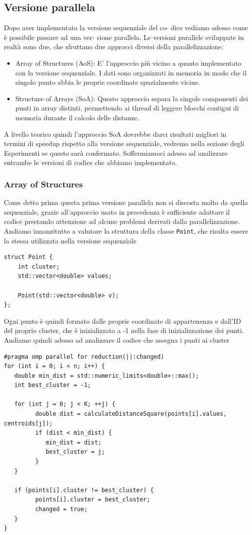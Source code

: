 \documentclass[10pt,twocolumn,letterpaper]{article}
\begin{document}
\subsection{Versione parallela}
Dopo aver implementato la versione sequenziale del co-
dice vediamo adesso come è possibile passare ad una ver-
sione parallela.
Le versioni parallele sviluppate in realtà sono due, che sfruttano due approcci diversi della parallelizzazione:
\begin{itemize}
   \item Array of Structures (AoS): E' l'approccio più vicino a quanto implementato con la versione sequenziale. I dati sono organizzati in memoria in modo che il singolo punto abbia le proprie coordinate spazialmente vicine.
   \item Structure of Arrays (SoA): Questo approccio separa la singole componenti dei punti in array distinti, permettendo ai thread di leggere blocchi contigui di memoria durante il calcolo delle distanze.
\end{itemize}
A livello teorico quindi l'approccio SoA dovrebbe darci risultati migliori in termini di speedup rispetto alla versione sequenziale, vedremo nella sezione degli Esperimenti se questo sarà confermato.
Soffermiamoci adesso ad analizzare entrambe le versioni di codice che abbiamo implementato.

\subsubsection{Array of Structures}
Come detto prima questa prima versione parallela non si discosta molto da quella sequenziale, grazie all'approccio usato in precedenza è sufficiente adattare il codice prestando attenzione ad alcune problemi derivati dalla parallelizzazione.
Andiamo innanzitutto a valutare la struttura della classe \lstinline{Point}, che risulta essere la stessa utilizzata nella versione sequenziale
\begin{lstlisting}[caption={Implementazione dei punti nella versione AoS}, label={lst:openmp}]
struct Point {
    int cluster;
    std::vector<double> values;

    Point(std::vector<double> v);
};
\end{lstlisting}
Ogni punto è quindi formato dalle proprie coordinate di appartenenza e dall'ID del proprio cluster, che è inizializzato a -1 nella fase di inizializzazione dei punti.
Andiamo quindi adesso ad analizzare il codice che assegna i punti ai cluster

\begin{lstlisting}[caption={Fase di assegnamento parallela AoS}, label={lst:openmp}]
#pragma omp parallel for reduction(||:changed)
for (int i = 0; i < n; i++) {
   double min_dist = std::numeric_limits<double>::max();
   int best_cluster = -1;

   for (int j = 0; j < K; ++j) {
         double dist = calculateDistanceSquare(points[i].values, centroids[j]);
         if (dist < min_dist) {
            min_dist = dist;
            best_cluster = j;
         }
   }

   if (points[i].cluster != best_cluster) {
         points[i].cluster = best_cluster;
         changed = true;
   }
}
\end{lstlisting}
\end{document}
